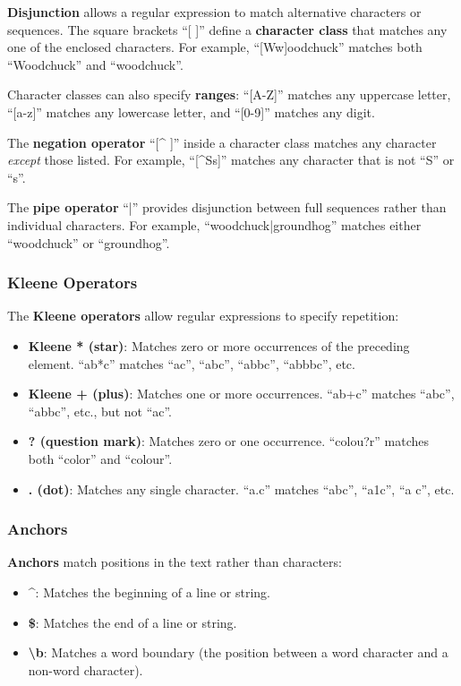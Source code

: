 \documentclass[11pt,a4paper]{article}
\begin{document}
\textbf{Disjunction} allows a regular expression to match alternative characters or sequences. The square brackets ``[ ]'' define a \textbf{character class} that matches any one of the enclosed characters. For example, ``[Ww]oodchuck'' matches both ``Woodchuck'' and ``woodchuck''.

Character classes can also specify \textbf{ranges}: ``[A-Z]'' matches any uppercase letter, ``[a-z]'' matches any lowercase letter, and ``[0-9]'' matches any digit.

The \textbf{negation operator} ``[\^{} ]'' inside a character class matches any character \textit{except} those listed. For example, ``[\^{}Ss]'' matches any character that is not ``S'' or ``s''.

The \textbf{pipe operator} ``|'' provides disjunction between full sequences rather than individual characters. For example, ``woodchuck|groundhog'' matches either ``woodchuck'' or ``groundhog''.

\subsubsection{Kleene Operators}

The \textbf{Kleene operators} allow regular expressions to specify repetition:
\begin{itemize}
    \item \textbf{Kleene * (star)}: Matches zero or more occurrences of the preceding element. ``ab*c'' matches ``ac'', ``abc'', ``abbc'', ``abbbc'', etc.
    \item \textbf{Kleene + (plus)}: Matches one or more occurrences. ``ab+c'' matches ``abc'', ``abbc'', etc., but not ``ac''.
    \item \textbf{? (question mark)}: Matches zero or one occurrence. ``colou?r'' matches both ``color'' and ``colour''.
    \item \textbf{. (dot)}: Matches any single character. ``a.c'' matches ``abc'', ``a1c'', ``a c'', etc.
\end{itemize}

\subsubsection{Anchors}

\textbf{Anchors} match positions in the text rather than characters:
\begin{itemize}
    \item \textbf{\^{}}: Matches the beginning of a line or string.
    \item \textbf{\$}: Matches the end of a line or string.
    \item \textbf{\textbackslash b}: Matches a word boundary (the position between a word character and a non-word character).
\end{itemize}
\end{document}
